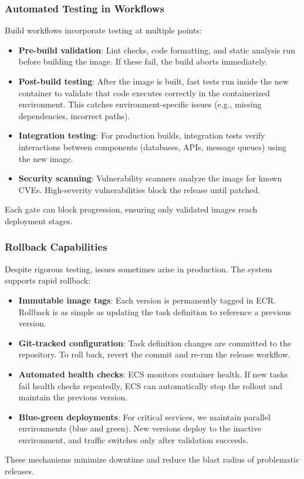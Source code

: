\subsubsection{Automated Testing in Workflows}
Build workflows incorporate testing at multiple points:
\begin{itemize}
  \item \textbf{Pre-build validation}: Lint checks, code formatting, and
    static analysis run before building the image. If these fail, the build
    aborts immediately.

  \item \textbf{Post-build testing}: After the image is built, fast
    tests run inside the new container to validate that code executes
    correctly in the containerized environment. This catches environment-specific
    issues (e.g., missing dependencies, incorrect paths).

  \item \textbf{Integration testing}: For production builds,
    integration tests verify interactions between components (databases,
    APIs, message queues) using the new image.

  \item \textbf{Security scanning}: Vulnerability scanners analyze the
    image for known CVEs. High-severity vulnerabilities block the
    release until patched.
\end{itemize}
Each gate can block progression, ensuring only validated images reach deployment
stages.
\subsubsection{Rollback Capabilities}
Despite rigorous testing, issues sometimes arise in production. The
system supports rapid rollback:
\begin{itemize}
  \item \textbf{Immutable image tags}: Each version is permanently tagged
    in ECR. Rollback is as simple as updating the task definition to
    reference a previous version.

  \item \textbf{Git-tracked configuration}: Task definition changes are
    committed to the repository. To roll back, revert the commit and re-run
    the release workflow.

  \item \textbf{Automated health checks}: ECS monitors container health.
    If new tasks fail health checks repeatedly, ECS can automatically stop
    the rollout and maintain the previous version.

  \item \textbf{Blue-green deployments}: For critical services, we
    maintain parallel environments (blue and green). New versions deploy
    to the inactive environment, and traffic switches only after
    validation succeeds.
\end{itemize}
These mechanisms minimize downtime and reduce the blast radius of problematic
releases.

